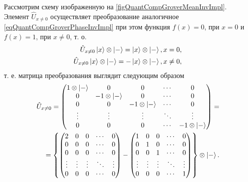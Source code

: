 

Рассмотрим схему изображенную на
\autoref{figQuantCompGroverMeanInvImpl}. Элемент $\hat{U}_{x \ne 0}$
осуществляет преобразование аналогичное
\eqref{eqQuantCompGroverPhaseInvImpl} при этом функция
$f\left(x\right) = 0$, при $x = 0$ и $f\left(x\right) = 1$, при $x \ne
0$, т. о.
\begin{eqnarray}
\hat{U}_{x \ne 0} \ket{x}\otimes\ket{-} 
= \ket{x}\otimes\ket{-}, x = 0,
\nonumber \\
\hat{U}_{x \ne 0} \ket{x}\otimes\ket{-} 
= - \ket{x}\otimes\ket{-}, x \ne 0,
\nonumber
\end{eqnarray}
т. е. матрица преобразования выглядит следующим образом
\begin{eqnarray}
\hat{U}_{x \ne 0} = 
\begin{pmatrix}
1 \otimes \ket{-} & 0 & 0 & \cdots & 0 \\
0 & -1 \otimes \ket{-}  & 0 & \cdots & 0 \\
0 & 0 & -1 \otimes \ket{-}   & \cdots & 0 \\
\vdots & \vdots & \vdots & \ddots & \vdots \\
0 & 0 & 0  & \cdots & -1 \otimes \ket{-}  \\
\end{pmatrix}
=
\nonumber \\
=
\left\{
\begin{pmatrix}
2  & 0 & 0 & \cdots & 0 \\
0 & 0 & 0 & \cdots & 0 \\
0 & 0 & 0 & \cdots & 0 \\
\vdots & \vdots & \vdots & \ddots & \vdots \\
0 & 0 & 0  & \cdots & 0 \\
\end{pmatrix} - 
\begin{pmatrix}
1 & 0 & 0 & \cdots & 0 \\
0 & 1 & 0 & \cdots & 0 \\
0 & 0 & 1 & \cdots & 0 \\
\vdots & \vdots & \vdots & \ddots & \vdots \\
0 & 0 & 0  & \cdots & 1  \\
\end{pmatrix}
\right\}
\otimes \ket{-} 
. 
\nonumber
\end{eqnarray}

